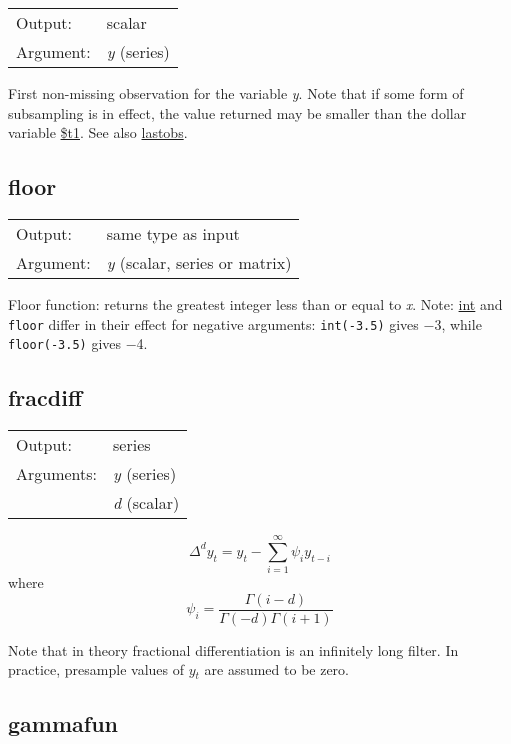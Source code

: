 \begin{tabular}{ll}
Output:     & scalar\\
Argument:   & \textsl{y} (series)\\
\end{tabular}

	  First non-missing observation for the variable
	  \textsl{y}. Note that if some form of subsampling is
	  in effect, the value returned may be smaller than the dollar
	  variable \hyperlink{func-dolt1}{\$t1}. 
	  See also \hyperlink{func-lastobs}{lastobs}.

\subsection{floor}
\hypertarget{func-floor}{}

\begin{tabular}{ll}
Output:     & same type as input\\
Argument:   & \textsl{y} (scalar, series or matrix)\\
\end{tabular}

	  Floor function: returns the greatest integer less than or equal
	  to \textsl{x}. Note: \hyperlink{func-int}{int} and
	  \texttt{floor} differ in their effect for negative arguments:
	  \texttt{int(-3.5)} gives $-$3, while
	  \texttt{floor(-3.5)} gives $-$4. 

\subsection{fracdiff}
\hypertarget{func-fracdiff}{}

\begin{tabular}{ll}
Output:     & series\\
Arguments:  & \textsl{y} (series)\\
           & \textsl{d} (scalar)\\
\end{tabular}

	    \[
	    \Delta^d y_t = y_t - \sum_{i=1}^{\infty} \psi_i y_{t-i}
	    \]
	  where
	    \[\psi_i = \frac{\Gamma(i-d)}{\Gamma(-d) \Gamma(i+1)}\]

	  Note that in theory fractional differentiation is an infinitely
	  long filter. In practice, presample values of
	  \ensuremath{y}\ensuremath{_{t}} are assumed to be zero.

\subsection{gammafun}
\hypertarget{func-gammafun}{}

